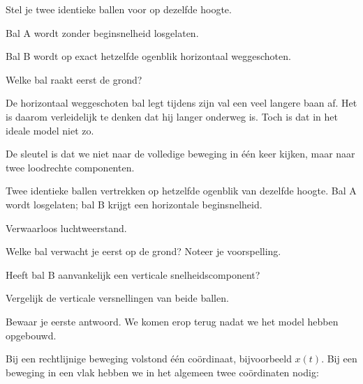 \documentclass{ximera}
\begin{document}


Stel je twee identieke ballen voor op dezelfde hoogte.

Bal A wordt zonder beginsnelheid losgelaten.

Bal B wordt op exact hetzelfde ogenblik horizontaal weggeschoten.

Welke bal raakt eerst de grond?

De horizontaal weggeschoten bal legt tijdens zijn val een veel langere
baan af. Het is daarom verleidelijk te denken dat hij langer onderweg
is. Toch is dat in het ideale model niet zo.

De sleutel is dat we niet naar de volledige beweging in één keer
kijken, maar naar twee loodrechte componenten.

\begin{oefening}{\oefB\ESS}

Twee identieke ballen vertrekken op hetzelfde ogenblik van dezelfde
hoogte. Bal A wordt losgelaten; bal B krijgt een horizontale
beginsnelheid.

Verwaarloos luchtweerstand.

\begin{question}
Welke bal verwacht je eerst op de grond? Noteer je voorspelling.
\end{question}

\begin{question}
Heeft bal B aanvankelijk een verticale snelheidscomponent?
\end{question}

\begin{question}
Vergelijk de verticale versnellingen van beide ballen.
\end{question}

Bewaar je eerste antwoord. We komen erop terug nadat we het model
hebben opgebouwd.

\end{oefening}




Bij een rechtlijnige beweging volstond één coördinaat, bijvoorbeeld
$x(t)$. Bij een beweging in een vlak hebben we in het algemeen twee
coördinaten nodig:
\end{document}
